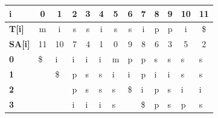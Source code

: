\begin{table}[h]
\centering
\label{my-label10}
\begin{tabular}{|l|l|l|l|l|l|l|l|l|l|l|l|l|}
\hline
\textbf{i}         & \multicolumn{1}{c|}{0}  & \multicolumn{1}{c|}{1}  & \multicolumn{1}{c|}{2} & \multicolumn{1}{c|}{3} & \multicolumn{1}{c|}{4} & \multicolumn{1}{c|}{5} & \multicolumn{1}{c|}{6} & \multicolumn{1}{c|}{7} & \multicolumn{1}{c|}{8} & \multicolumn{1}{c|}{9} & \multicolumn{1}{c|}{10} & \multicolumn{1}{c|}{11} \\ \hline
\textbf{T{[}i{]}}  & \multicolumn{1}{c|}{m}  & \multicolumn{1}{c|}{i}  & \multicolumn{1}{c|}{s} & \multicolumn{1}{c|}{s} & \multicolumn{1}{c|}{i} & \multicolumn{1}{c|}{s} & \multicolumn{1}{c|}{s} & \multicolumn{1}{c|}{i} & \multicolumn{1}{c|}{p} & \multicolumn{1}{c|}{p} & \multicolumn{1}{c|}{i}  & \multicolumn{1}{c|}{\$}  \\ \hline
\textbf{SA{[}i{]}} & \multicolumn{1}{c|}{11} & \multicolumn{1}{c|}{10} & \multicolumn{1}{c|}{7} & \multicolumn{1}{c|}{4} & \multicolumn{1}{c|}{1} & \multicolumn{1}{c|}{0} & \multicolumn{1}{c|}{9} & \multicolumn{1}{c|}{8} & \multicolumn{1}{c|}{6} & \multicolumn{1}{c|}{3} & \multicolumn{1}{c|}{5}  & \multicolumn{1}{c|}{2}  \\ \hline
\textbf{0}                                                       & \$                       & i                       & i                      & i                      & i                      & m                      & p                      & p                      & s                      & s                      & s                       & s                       \\ \hline
\textbf{1}                                                       &                         & \$                       & p                      & s                      & s                      & i                      & i                      & p                      & i                      & i                      & s                       & s                       \\ \hline
\textbf{2}                                                       &                         &                         & p                      & s                      & s                      & s                      & \$                      & i                      & p                      & s                      & i                       & i                       \\ \hline
\textbf{3}                                                       &                         &                         & i                      & i                      & i                      & s                      &                        & \$                      & p                      & s                      & p                       & s                       \\ \hline

\end{tabular}
\end{table}
